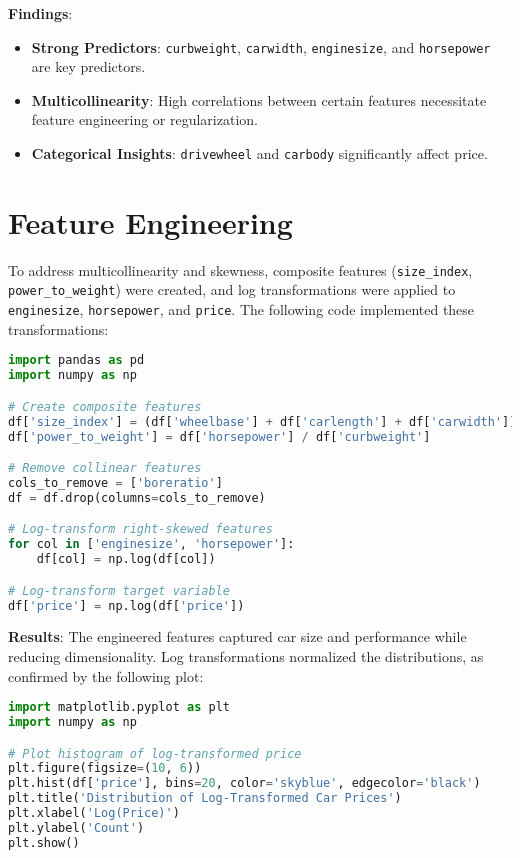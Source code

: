 \documentclass[12pt]{article}
\begin{document}
\textbf{Findings}:
\begin{itemize}
    \item \textbf{Strong Predictors}: \texttt{curbweight}, \texttt{carwidth}, \texttt{enginesize}, and \texttt{horsepower} are key predictors.
    \item \textbf{Multicollinearity}: High correlations between certain features necessitate feature engineering or regularization.
    \item \textbf{Categorical Insights}: \texttt{drivewheel} and \texttt{carbody} significantly affect price.
\end{itemize}

\section{Feature Engineering}
To address multicollinearity and skewness, composite features (\texttt{size\_index}, \texttt{power\_to\_weight}) were created, and log transformations were applied to \texttt{enginesize}, \texttt{horsepower}, and \texttt{price}. The following code implemented these transformations:

\begin{lstlisting}[language=Python, caption=Feature Engineering Code]
import pandas as pd
import numpy as np

# Create composite features
df['size_index'] = (df['wheelbase'] + df['carlength'] + df['carwidth']) / 3
df['power_to_weight'] = df['horsepower'] / df['curbweight']

# Remove collinear features
cols_to_remove = ['boreratio']
df = df.drop(columns=cols_to_remove)

# Log-transform right-skewed features
for col in ['enginesize', 'horsepower']:
    df[col] = np.log(df[col])

# Log-transform target variable
df['price'] = np.log(df['price'])
\end{lstlisting}

\textbf{Results}: The engineered features captured car size and performance while reducing dimensionality. Log transformations normalized the distributions, as confirmed by the following plot:

\begin{lstlisting}[language=Python, caption=Log-Transformed Price Histogram Code]
import matplotlib.pyplot as plt
import numpy as np

# Plot histogram of log-transformed price
plt.figure(figsize=(10, 6))
plt.hist(df['price'], bins=20, color='skyblue', edgecolor='black')
plt.title('Distribution of Log-Transformed Car Prices')
plt.xlabel('Log(Price)')
plt.ylabel('Count')
plt.show()
\end{lstlisting}
\end{document}

